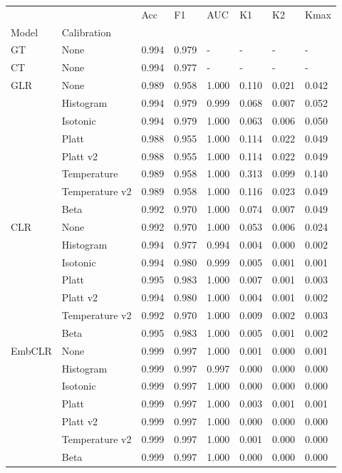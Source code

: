 \begin{tabular}{llllllll}
\toprule
 &  & Acc & F1 & AUC & K1 & K2 & Kmax \\
Model & Calibration &  &  &  &  &  &  \\
\midrule
GT & None & 0.994 & 0.979 & - & - & - & - \\
\cline{1-8}
CT & None & 0.994 & 0.977 & - & - & - & - \\
\cline{1-8}
\multirow[t]{8}{*}{GLR} & None & 0.989 & 0.958 & 1.000 & 0.110 & 0.021 & 0.042 \\
 & Histogram & 0.994 & 0.979 & 0.999 & 0.068 & 0.007 & 0.052 \\
 & Isotonic & 0.994 & 0.979 & 1.000 & 0.063 & 0.006 & 0.050 \\
 & Platt & 0.988 & 0.955 & 1.000 & 0.114 & 0.022 & 0.049 \\
 & Platt v2 & 0.988 & 0.955 & 1.000 & 0.114 & 0.022 & 0.049 \\
 & Temperature & 0.989 & 0.958 & 1.000 & 0.313 & 0.099 & 0.140 \\
 & Temperature v2 & 0.989 & 0.958 & 1.000 & 0.116 & 0.023 & 0.049 \\
 & Beta & 0.992 & 0.970 & 1.000 & 0.074 & 0.007 & 0.049 \\
\cline{1-8}
\multirow[t]{7}{*}{CLR} & None & 0.992 & 0.970 & 1.000 & 0.053 & 0.006 & 0.024 \\
 & Histogram & 0.994 & 0.977 & 0.994 & 0.004 & 0.000 & 0.002 \\
 & Isotonic & 0.994 & 0.980 & 0.999 & 0.005 & 0.001 & 0.001 \\
 & Platt & 0.995 & 0.983 & 1.000 & 0.007 & 0.001 & 0.003 \\
 & Platt v2 & 0.994 & 0.980 & 1.000 & 0.004 & 0.001 & 0.002 \\
 & Temperature v2 & 0.992 & 0.970 & 1.000 & 0.009 & 0.002 & 0.003 \\
 & Beta & 0.995 & 0.983 & 1.000 & 0.005 & 0.001 & 0.002 \\
\cline{1-8}
\multirow[t]{7}{*}{EmbCLR} & None & 0.999 & 0.997 & 1.000 & 0.001 & 0.000 & 0.001 \\
 & Histogram & 0.999 & 0.997 & 0.997 & 0.000 & 0.000 & 0.000 \\
 & Isotonic & 0.999 & 0.997 & 1.000 & 0.000 & 0.000 & 0.000 \\
 & Platt & 0.999 & 0.997 & 1.000 & 0.003 & 0.001 & 0.001 \\
 & Platt v2 & 0.999 & 0.997 & 1.000 & 0.000 & 0.000 & 0.000 \\
 & Temperature v2 & 0.999 & 0.997 & 1.000 & 0.001 & 0.000 & 0.000 \\
 & Beta & 0.999 & 0.997 & 1.000 & 0.000 & 0.000 & 0.000 \\
\cline{1-8}
\bottomrule
\end{tabular}
